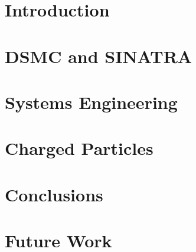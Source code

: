 \chapter{Introduction}
\label{chap:intro}


\chapter{DSMC and SINATRA}
\label{chap:dsmc}



\chapter{Systems Engineering}
\label{chap:systems}




\chapter{Charged Particles}
\label{chap:charge}




\chapter{Conclusions}
\label{chap:conclusions}


\chapter{Future Work}
